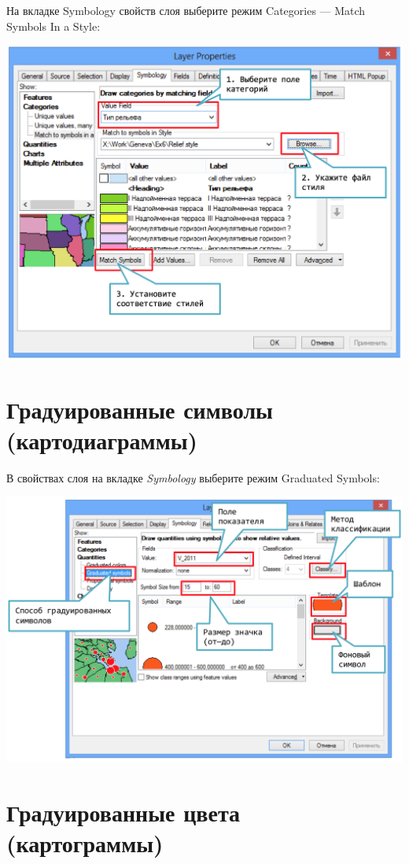 \documentclass[]{book}
\theoremstyle{definition}
\theoremstyle{definition}
\theoremstyle{definition}
\theoremstyle{remark}
\begin{document}
На вкладке Symbology свойств слоя выберите режим Categories --- Match
Symbols In a Style:

\includegraphics{images/Appendix/image19.png}

\hypertarget{--}{%
\section{Градуированные символы (картодиаграммы)}\label{--}}

В свойствах слоя на вкладке \emph{Symbology} выберите режим Graduated
Symbols:

\includegraphics{images/Appendix/image20.png}

\hypertarget{--}{%
\section{Градуированные цвета (картограммы)}\label{--}}
\end{document}
